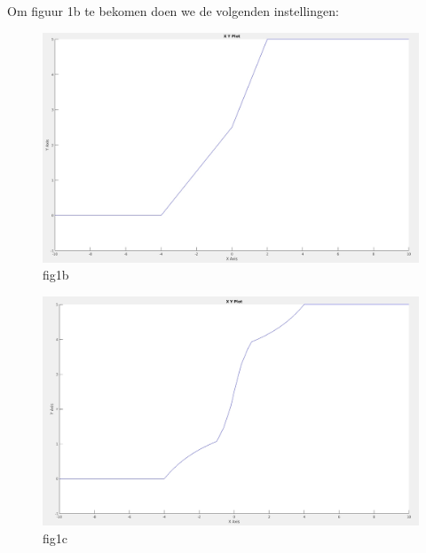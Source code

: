 \documentclass[a4paper, 12pt]{article}
\begin{document}
Om figuur 1b te bekomen doen we de volgenden instellingen: 
\begin{table}[!h]
\centering
{}
\end{table}

\begin{figure}[!h]
	\includegraphics[width=0.9\linewidth]{Labo4_1_fig1b.jpg}
	\caption{fig1b}
\end{figure}

\newpage

\begin{table}[!h]
\centering
{}
\end{table}

\begin{figure}[!h]
	\includegraphics[width=0.9\linewidth]{Labo4_1_fig1c.jpg}
	\caption{fig1c}
\end{figure}
\end{document}
